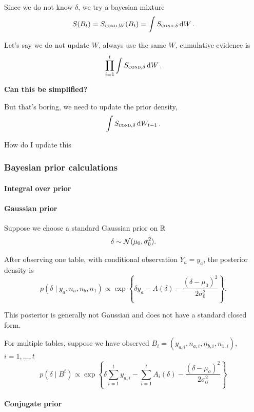 Since we do not know $\delta$, we try a bayesian mixture
\begin{equation*}
	S(B_t) = S_{\textsc{cond}, W}(B_t) = \int S_{\textsc{cond}, \delta} \dd{W}.
\end{equation*}

Let's say we do not update $W$, always use the same $W$,
cumulative evidence is
\begin{equation*}
	\prod_{i=1}^t \int S_{\textsc{cond}, \delta} \dd{W}.
\end{equation*}

\textbf{Can this be simplified?}

But that's boring, we need to update the prior density,
\begin{equation*}
	\int S_{\textsc{cond}, \delta} \dd{W_{t-1}}.
\end{equation*}

How do I update this

\subsubsection{Bayesian prior calculations}

\paragraph{Integral over prior}

\paragraph{Gaussian prior}

Suppose we choose a standard Gaussian prior on $\mathbb{R}$
$$
    \delta \sim \mathcal{N}(\mu_0,\sigma_0^2).
$$

After observing one table, with conditional observation $Y_a=y_a$, the posterior density is
$$
    p(\delta\mid y_a,n_a,n_b,n_1)
    \propto
    \exp\left\{
        \delta y_a
        - A(\delta)
        - \frac{(\delta-\mu_0)^2}{2\sigma_0^2}
    \right\}.
$$

This posterior is generally not Gaussian and does not have a standard closed form.

For multiple tables,
suppose we have observed $B_i=(y_{a,i},n_{a,i},n_{b,i},n_{1,i})$, $i=1,\dots,t$
$$
	p(\delta\mid B^t) \propto 
	\exp\left\{
		\delta\sum^t_{i=1} y_{a,i} 
		- \sum^t_{i=1} A_i(\delta)
		- \frac{(\delta - \mu_o)^2}{2\sigma_0^2}
	\right\}
$$

\paragraph{Conjugate prior}

